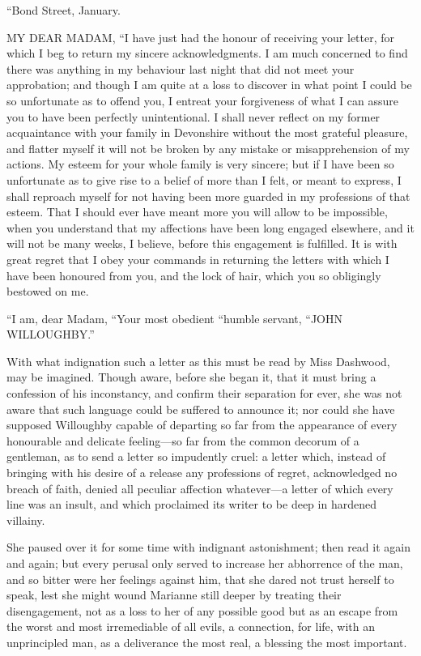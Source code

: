 “Bond Street, January.

MY DEAR MADAM,\crlf
“I have just had the honour of receiving your letter, for which I beg to return my sincere acknowledgments. I am much concerned to find there was anything in my behaviour last night that did not meet your approbation; and though I am quite at a loss to discover in what point I could be so unfortunate as to offend you, I entreat your forgiveness of what I can assure you to have been perfectly unintentional. I shall never reflect on my former acquaintance with your family in Devonshire without the most grateful pleasure, and flatter myself it will not be broken by any mistake or misapprehension of my actions. My esteem for your whole family is very sincere; but if I have been so unfortunate as to give rise to a belief of more than I felt, or meant to express, I shall reproach myself for not having been more guarded in my professions of that esteem. That I should ever have meant more you will allow to be impossible, when you understand that my affections have been long engaged elsewhere, and it will not be many weeks, I believe, before this engagement is fulfilled. It is with great regret that I obey your commands in returning the letters with which I have been honoured from you, and the lock of hair, which you so obligingly bestowed on me.

“I am, dear Madam,\crlf
“Your most obedient\crlf
“humble servant,\crlf
“JOHN WILLOUGHBY.”

With what indignation such a letter as this must be read by Miss Dashwood, may be imagined. Though aware, before she began it, that it must bring a confession of his inconstancy, and confirm their separation for ever, she was not aware that such language could be suffered to announce it; nor could she have supposed Willoughby capable of departing so far from the appearance of every honourable and delicate feeling---so far from the common decorum of a gentleman, as to send a letter so impudently cruel: a letter which, instead of bringing with his desire of a release any professions of regret, acknowledged no breach of faith, denied all peculiar affection whatever---a letter of which every line was an insult, and which proclaimed its writer to be deep in hardened villainy.

She paused over it for some time with indignant astonishment; then read it again and again; but every perusal only served to increase her abhorrence of the man, and so bitter were her feelings against him, that she dared not trust herself to speak, lest she might wound Marianne still deeper by treating their disengagement, not as a loss to her of any possible good but as an escape from the worst and most irremediable of all evils, a connection, for life, with an unprincipled man, as a deliverance the most real, a blessing the most important.

